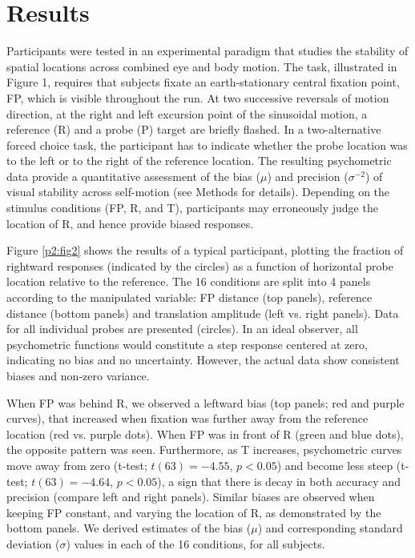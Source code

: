 \section{Results}

Participants were tested in an experimental paradigm that studies the stability of spatial locations across combined eye and body motion. The task, illustrated in Figure 1, requires that subjects fixate an earth-stationary central fixation point, FP, which is visible throughout the run. At two successive reversals of motion direction, at the right and left excursion point of the sinusoidal motion, a reference (R) and a probe (P) target are briefly flashed. In a two-alternative forced choice task, the participant has to indicate whether the probe location was to the left or to the right of the reference location. The resulting psychometric data provide a quantitative assessment of the bias ($\mu$) and precision ($\sigma^{-2}$) of visual stability across self-motion (see Methods for details). Depending on the stimulus conditions (FP, R, and T), participants may erroneously judge the location of R, and hence provide biased responses.

Figure \ref{p2:fig2} shows the results of a typical participant, plotting the fraction of rightward responses (indicated by the circles) as a function of horizontal probe location relative to the reference. The 16 conditions are split into 4 panels according to the manipulated variable: FP distance (top panels), reference distance (bottom panels) and translation amplitude (left vs. right panels). Data for all individual probes are presented (circles). In an ideal observer, all psychometric functions would constitute a step response centered at zero, indicating no bias and no uncertainty. However, the actual data show consistent biases and non-zero variance.

When FP was behind R, we observed a leftward bias (top panels; red and purple curves), that increased when fixation was further away from the reference location (red vs. purple dots). When FP was in front of R (green and blue dots), the opposite pattern was seen. Furthermore, as T increases, psychometric curves move away from zero (t-test; $t(63) = -4.55$, $p < 0.05$) and become less steep (t-test; $t(63) = -4.64$, $p < 0.05$), a sign that there is decay in both accuracy and precision (compare left and right panels). Similar biases are observed when keeping FP constant, and varying the location of R, as demonstrated by the bottom panels. We derived estimates of the bias ($\mu$) and corresponding standard deviation ($\sigma$) values in each of the 16 conditions, for all subjects.

